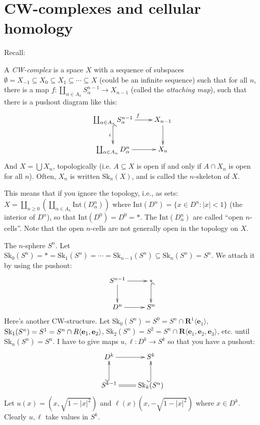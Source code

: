 \section{CW-complexes and cellular homology}
Recall:
\begin{definition}
A \emph{CW-complex} is a space $X$ with a sequence of subspaces $\emptyset=X_{-1}\subseteq X_0\subseteq X_1\subseteq\cdots\subseteq X$ (could be an infinite sequence) such that for all $n$, there is a map $f:\coprod_{\alpha\in A_n}S^{n-1}_\alpha\to X_{n-1}$ (called the \emph{attaching map}), such that there is a pushout diagram like this:
\begin{equation*}
\xymatrix{\coprod_{\alpha\in A_n}S^{n-1}_\alpha\ar[r]^f\ar@{^(->}[d]_i & X_{n-1}\ar[d]\\
\coprod_{\alpha\in A_n}D^n_\alpha\ar[r] & X_{n}}
\end{equation*}
And $X=\bigcup X_n$, topologically (i.e. $A\subseteq X$ is open if and only if $A\cap X_n$ is open for all $n$). Often, $X_n$ is written $\mathrm{Sk}_n(X)$, and is called the $n$-skeleton of $X$.
\end{definition}
\begin{remark}
This means that if you ignore the topology, i.e., as sets: $X=\coprod_{n\geq 0}\left(\coprod_{\alpha\in A_n}\mathrm{Int}(D^n_\alpha)\right)$ where $\mathrm{Int}(D^n)=\{x\in D^n: |x|<1\}$ (the interior of $D^n$), so that $\mathrm{Int}(D^0)=D^0=\ast$. The $\mathrm{Int}(D^n_\alpha)$ are called ``open $n$-cells''. Note that the open $n$-cells are not generally open in the topology on $X$.
\end{remark}
\begin{example}
The $n$-sphere $S^n$. Let $\mathrm{Sk}_0(S^n)=\ast=\mathrm{Sk}_1(S^n)=\cdots=\mathrm{Sk}_{n-1}(S^n)\subseteq \mathrm{Sk}_n(S^n)=S^n$. We attach it by using the pushout:
\begin{equation*}
\xymatrix{S^{n-1}\ar[d]\ar[r] & \ast\ar@{^(->}[d]\\
D^n\ar[r] & S^n}
\end{equation*}
Here's another CW-structure. Let $\mathrm{Sk}_0(S^n)=S^0=S^n\cap \mathbf{R}^1\langle \mathbf{e}_1\rangle$, $\mathrm{Sk}_1(S^n)=S^{1}=S^n\cap\mathbf\mathbf{R}\langle \mathbf{e}_1,\mathbf{e}_2\rangle$, $\mathrm{Sk}_2(S^n)=S^2=S^n\cap\mathbf{R}\langle \mathbf{e}_1,\mathbf{e}_2,\mathbf{e}_3\rangle$, etc. until $\mathrm{Sk}_n(S^n)=S^n$. I have to give maps $u,\ell:D^k\to S^k$ so that you have a pushout:
\begin{equation*}
\xymatrix{D^k\ar[r] & S^k\\
S^{k-1}\ar@{^(->}[u]\ar@{=}[r] & \mathrm{Sk}_k(S^n)\ar@{^(->}[u]}
\end{equation*}
Let $u(x)=(x,\sqrt{1-|x|^2})$ and $\ell(x)(x,-\sqrt{1-|x|^2})$ where $x\in D^k$. Clearly $u,\ell$ take values in $S^k$.
\end{example}
